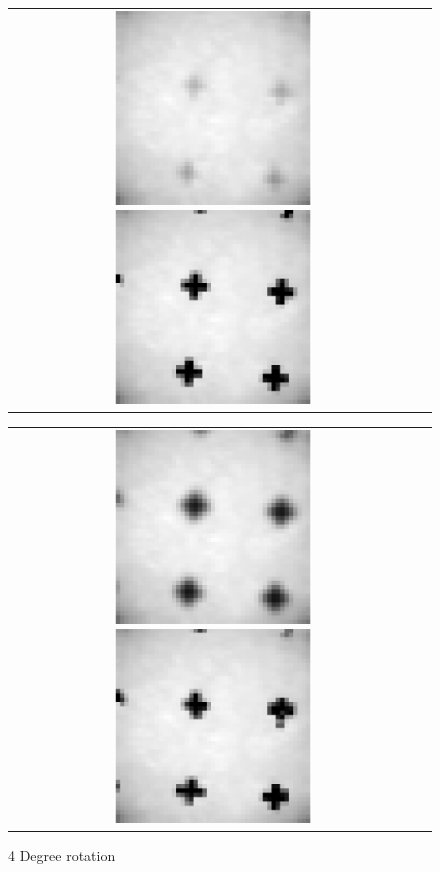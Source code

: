 \documentclass[iop]{emulateapj}
\begin{document}
\begin{figure}
        \begin{tabular}{cc}
            \includegraphics[width=0.5\textwidth]{rot_4_1}
            \includegraphics[width=0.5\textwidth]{rot_4_2}
        \end{tabular}
        \begin{tabular}{cc}
            \includegraphics[width=0.5\textwidth]{rot_4_3}
            \includegraphics[width=0.5\textwidth]{rot_4_4}
        \end{tabular}
        \caption{4 Degree rotation}
\end{figure}
\end{document}
